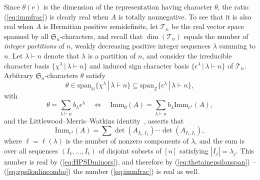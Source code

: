 \documentclass[12pt]{amsart}
\numberwithin{equation}{section}
\newcommand{\sn}{\mathfrak{S}_n}
\newcommand{\zsn}{\mathbb{Z}[\sn]}
\newcommand{\imm}[1]{\mathrm{Imm}_{#1}}
\newcommand{\spn}{\mathrm{span}}
\newcommand{\trspace}[1]{\mathcal{T}_{#1}}
\begin{document}
Since $\theta(e)$ is the dimension of the representation
having character $\theta$, the ratio (\ref{eq:immfrac})
is clearly real when $A$ is totally nonnegative.
To see that it is also real when $A$ is Hermitian positive semidefinite,
let $\trspace n$ be the
real vector space
spanned by all $\sn$-characters,
and recall that $\dim (\trspace n)$ 
equals the number of
{\em integer partitions} of $n$,
weakly decreasing positive integer sequences
$\lambda$
summing to $n$.
Let
$\lambda \vdash n$ denote that $\lambda$ is a partition of $n$,
and consider
the irreducible character basis
$\{ \chi^\lambda \,|\, \lambda \vdash n \}$ and
induced sign character basis
$\{ \epsilon^\lambda \,|\, \lambda \vdash n \}$ of $\trspace n$.
Arbitrary $\sn$-characters $\theta$ satisfy
\begin{equation}\label{eq:thetainepsilonspan}
  \theta \in \spn_{\mathbb N}\{\chi^\lambda \,|\, \lambda \vdash n \}
  \subseteq \spn_{\mathbb Z}\{\epsilon^\lambda \,|\, \lambda \vdash n \},
  \end{equation}
with
\begin{equation}\label{eq:epsilonlincombo}
  \theta = \sum_{\lambda \vdash n} b_\lambda \epsilon^\lambda
  \quad
  \Longleftrightarrow
  \quad
  \imm \theta(A) = \sum_{\lambda \vdash n} b_\lambda \imm{\epsilon^\lambda}(A),
  \end{equation}
and the
Littlewood--Merris--Watkins
identity~\cite{LittlewoodTGC}, \cite{MerWatIneq} asserts that
\begin{equation}\label{eq:lmw}
  \imm{\epsilon^\lambda}(A) = \sum \det(A_{I_1,I_1}) \cdots \det(A_{I_\ell,I_\ell}),
\end{equation}
where $\ell = \ell(\lambda)$ is the number of nonzero components of $\lambda$,
and the sum is over all sequences $(I_1,\dotsc,I_\ell)$ of disjoint
subsets of $[n]$ satisfying $|I_j|= \lambda_j$.
This number is real by (\ref{eq:HPSDminors}), and therefore
by (\ref{eq:thetainepsilonspan}) -- (\ref{eq:epsilonlincombo})
the number (\ref{eq:immfrac}) is real as well.
\end{document}
